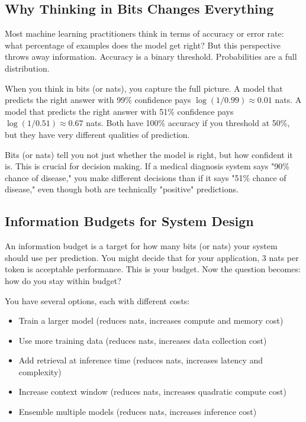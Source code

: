 \subsection{Why Thinking in Bits Changes Everything}

Most machine learning practitioners think in terms of accuracy or error rate: what percentage of examples does the model get right? But this perspective throws away information. Accuracy is a binary threshold. Probabilities are a full distribution.

When you think in bits (or nats), you capture the full picture. A model that predicts the right answer with 99\% confidence pays $\log(1/0.99) \approx 0.01$ nats. A model that predicts the right answer with 51\% confidence pays $\log(1/0.51) \approx 0.67$ nats. Both have 100\% accuracy if you threshold at 50\%, but they have very different qualities of prediction.

Bits (or nats) tell you not just whether the model is right, but how confident it is. This is crucial for decision making. If a medical diagnosis system says "90\% chance of disease," you make different decisions than if it says "51\% chance of disease," even though both are technically "positive" predictions.

\subsection{Information Budgets for System Design}

An information budget is a target for how many bits (or nats) your system should use per prediction. You might decide that for your application, 3 nats per token is acceptable performance. This is your budget. Now the question becomes: how do you stay within budget?

You have several options, each with different costs:

\begin{itemize}
\item Train a larger model (reduces nats, increases compute and memory cost)
\item Use more training data (reduces nats, increases data collection cost)
\item Add retrieval at inference time (reduces nats, increases latency and complexity)
\item Increase context window (reduces nats, increases quadratic compute cost)
\item Ensemble multiple models (reduces nats, increases inference cost)
\end{itemize}

